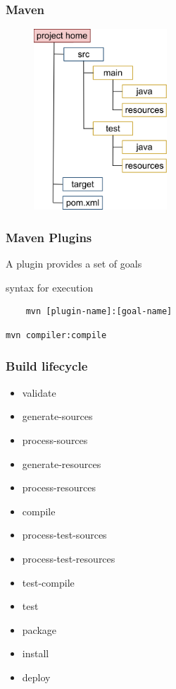 \documentclass{beamer}
\begin{document}
\begin{frame}[fragile]
\frametitle{Maven}

\begin{figure}[ht]
       \includegraphics[width=5cm]{./images/Maven_CoC.png}
 \end{figure}
 
\end{frame}


\begin{frame}[fragile]
\frametitle{Maven Plugins}

A plugin provides a set of goals
\begin{block}{syntax for execution}
\begin{lstlisting}
    mvn [plugin-name]:[goal-name]
\end{lstlisting}
\end{block}

\begin{example}
 \begin{lstlisting}
mvn compiler:compile
\end{lstlisting}
\end{example}
\end{frame}


\begin{frame}[fragile]
\frametitle{Build lifecycle}

\begin{itemize}
\item validate
\item generate-sources
\item process-sources
\item generate-resources
\item process-resources
\item compile
\item process-test-sources
\item process-test-resources
\item test-compile
\item test
\item package
\item install
\item deploy
\end{itemize}


\end{frame}
\end{document}
